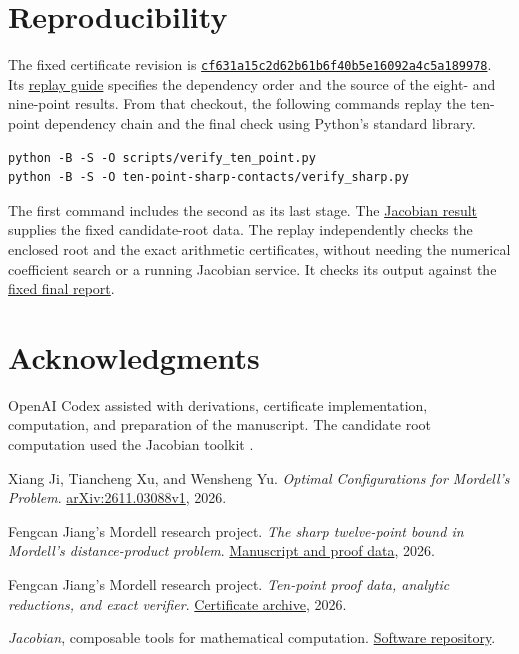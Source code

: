 \documentclass[11pt]{article}
\newcommand{\certbase}{https://github.com/harrykane8816627373-cell/mordell-research}
\newcommand{\certrev}{cf631a15c2d62b61b6f40b5e16092a4c5a189978}
\newcommand{\certfile}[2]{\href{\certbase/blob/\certrev/#1}{#2}}
\begin{document}
\section*{Reproducibility}

The fixed certificate revision is
\href{\certbase/commit/\certrev}{\texttt{\certrev}}.
Its \certfile{docs/REPRODUCING.md}{replay guide} specifies the
dependency order and the source of the eight- and nine-point
results. From that checkout, the following commands replay the
ten-point dependency chain and the final check using Python's
standard library.
\begin{verbatim}
python -B -S -O scripts/verify_ten_point.py
python -B -S -O ten-point-sharp-contacts/verify_sharp.py
\end{verbatim}
The first command includes the second as its last stage. The
\certfile{ten-point-contact-geometry/root_box_jacobian.json}{Jacobian
result} supplies the fixed candidate-root data. The replay
independently checks the enclosed root and the exact arithmetic
certificates, without needing the numerical coefficient search
or a running Jacobian service. It checks its output against
the \certfile{ten-point-sharp-contacts/global_verification_report.json}
{fixed final report}.

\section*{Acknowledgments}

OpenAI Codex assisted with derivations, certificate implementation,
computation, and preparation of the manuscript. The candidate
root computation used the Jacobian toolkit \cite{jacobian}.

\begin{thebibliography}{9}
Xiang Ji, Tiancheng Xu, and Wensheng Yu.
\newblock \emph{Optimal Configurations for Mordell's Problem}.
\newblock \href{https://arxiv.org/abs/2611.03088v1}{arXiv:2611.03088v1}, 2026.

Fengcan Jiang's Mordell research project.
\newblock \emph{The sharp twelve-point bound in Mordell's distance-product problem}.
\newblock \certfile{twelve-point-sharp-global/manuscript/README.md}{Manuscript and proof data}, 2026.

Fengcan Jiang's Mordell research project.
\newblock \emph{Ten-point proof data, analytic reductions, and exact verifier}.
\newblock \certfile{ten-point-sharp-contacts/README.md}{Certificate archive}, 2026.

\emph{Jacobian}, composable tools for mathematical computation.
\newblock \href{https://github.com/morluto/jacobian}{Software repository}.
\end{thebibliography}
\end{document}
